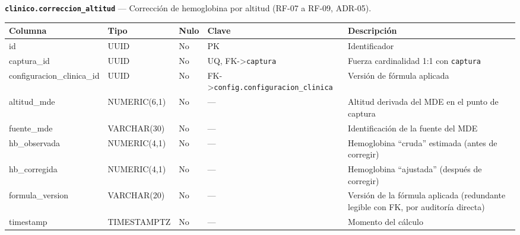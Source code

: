 \documentclass[11pt,a4paper]{article}
\begin{document}
\textbf{\texttt{clinico.correccion\_altitud}} --- Corrección de hemoglobina por altitud (RF-07 a RF-09, ADR-05).

{\small
\begin{longtable}[]{@{}
  >{\raggedright\arraybackslash}p{}
  >{\raggedright\arraybackslash}p{}
  >{\raggedright\arraybackslash}p{}
  >{\raggedright\arraybackslash}p{}
  >{\raggedright\arraybackslash}p{}@{}}
\toprule\noalign{}
\begin{minipage}[b]{\linewidth}\raggedright
Columna
\end{minipage} & \begin{minipage}[b]{\linewidth}\raggedright
Tipo
\end{minipage} & \begin{minipage}[b]{\linewidth}\raggedright
Nulo
\end{minipage} & \begin{minipage}[b]{\linewidth}\raggedright
Clave
\end{minipage} & \begin{minipage}[b]{\linewidth}\raggedright
Descripción
\end{minipage} \\
\midrule\noalign{}
\endhead
\bottomrule\noalign{}
\endlastfoot
id & UUID & No & PK & Identificador \\
captura\_id & UUID & No & UQ, FK-\textgreater{}\texttt{captura} & Fuerza cardinalidad 1:1 con \texttt{captura} \\
configuracion\_clinica\_id & UUID & No & FK-\textgreater{}\texttt{config.configuracion\_clinica} & Versión de fórmula aplicada \\
altitud\_mde & NUMERIC(6,1) & No & --- & Altitud derivada del MDE en el punto de captura \\
fuente\_mde & VARCHAR(30) & No & --- & Identificación de la fuente del MDE \\
hb\_observada & NUMERIC(4,1) & No & --- & Hemoglobina ``cruda'' estimada (antes de corregir) \\
hb\_corregida & NUMERIC(4,1) & No & --- & Hemoglobina ``ajustada'' (después de corregir) \\
formula\_version & VARCHAR(20) & No & --- & Versión de la fórmula aplicada (redundante legible con FK, por auditoría directa) \\
timestamp & TIMESTAMPTZ & No & --- & Momento del cálculo \\
\end{longtable}
}
\end{document}
